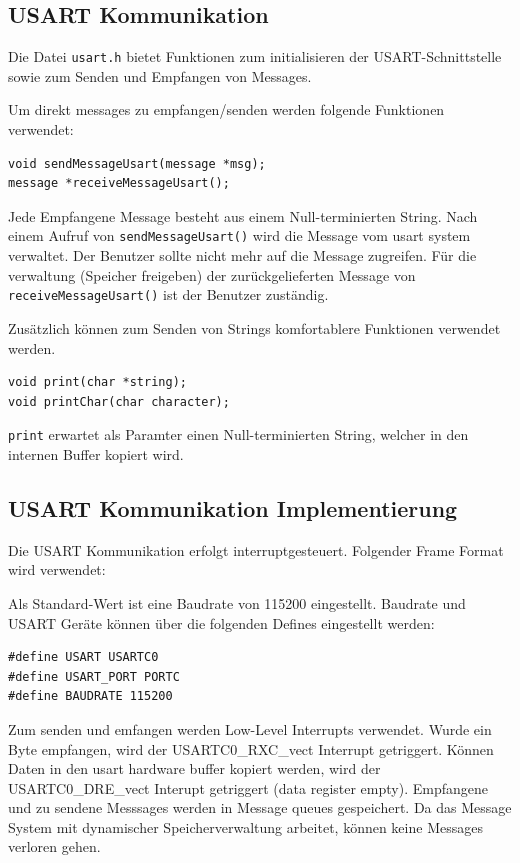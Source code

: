 \documentclass[fontsize=12pt, toc=bibliography, notitlepage]{scrreprt}
\begin{document}
\subsection{USART Kommunikation}
\label{subsec:shell-communication}
Die Datei \lstinline$usart.h$ bietet Funktionen zum initialisieren der USART-Schnittstelle sowie zum Senden und Empfangen von Messages.

Um direkt messages zu empfangen/senden werden folgende Funktionen verwendet:

\begin{lstlisting}
void sendMessageUsart(message *msg);
message *receiveMessageUsart();
\end{lstlisting}

Jede Empfangene Message besteht aus einem Null-terminierten String. Nach einem Aufruf von \lstinline$sendMessageUsart()$ wird die Message vom usart system verwaltet. Der Benutzer sollte nicht mehr auf die Message zugreifen. Für die verwaltung (Speicher freigeben) der zurückgelieferten Message von \lstinline$receiveMessageUsart()$ ist der Benutzer zuständig.

Zusätzlich können zum Senden von Strings komfortablere Funktionen verwendet werden.

\begin{lstlisting}
void print(char *string);
void printChar(char character);
\end{lstlisting}

\lstinline$print$ erwartet als Paramter einen Null-terminierten String, welcher in den internen Buffer kopiert wird.

\subsection{USART Kommunikation Implementierung}
\label{subsec:shell-communication-impl}
Die USART Kommunikation erfolgt interruptgesteuert. Folgender Frame Format wird verwendet:

Als Standard-Wert ist eine Baudrate von 115200 eingestellt. Baudrate und USART Geräte können über die folgenden Defines eingestellt werden:

\begin{lstlisting}
#define USART USARTC0
#define USART_PORT PORTC
#define BAUDRATE 115200
\end{lstlisting}

Zum senden und emfangen werden Low-Level Interrupts verwendet. Wurde ein Byte empfangen, wird der USARTC0\_RXC\_vect Interrupt getriggert. Können Daten in den usart hardware buffer kopiert werden, wird der USARTC0\_DRE\_vect Interupt getriggert (data register empty). Empfangene und zu sendene Messsages werden in Message queues gespeichert. Da das Message System mit dynamischer Speicherverwaltung arbeitet, können keine Messages verloren gehen.
\end{document}
